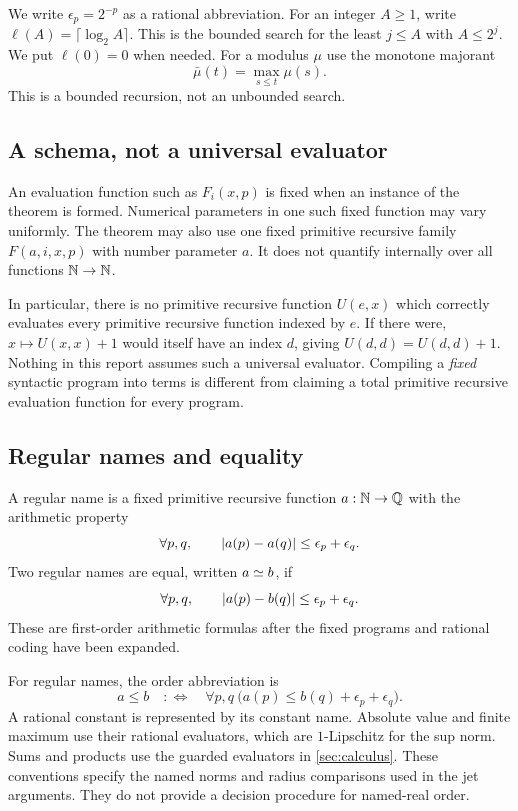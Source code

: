 We write $\epsilon_p=2^{-p}$ as a rational abbreviation. For an integer
$A\ge1$, write $\ell(A)=\lceil\log_2 A\rceil$. This is the bounded search
for the least $j\le A$ with $A\le2^j$. We put $\ell(0)=0$ when needed.
For a modulus $\mu$ use the monotone majorant
\[
 \bar\mu(t)=\max_{s\le t}\mu(s).
\]
This is a bounded recursion, not an unbounded search.

\subsection{A schema, not a universal evaluator}\label{sec:schema}

An evaluation function such as $F_i(x,p)$ is fixed when an instance of the
theorem is formed. Numerical parameters in one such fixed function may vary
uniformly. The theorem may also use one fixed primitive recursive family
$F(a,i,x,p)$ with number parameter $a$. It does not quantify internally over
all functions $\mathbb N\to\mathbb N$.

In particular, there is no primitive recursive function $U(e,x)$ which
correctly evaluates every primitive recursive function indexed by $e$.
If there were, $x\mapsto U(x,x)+1$ would itself have an index $d$, giving
$U(d,d)=U(d,d)+1$. Nothing in this report assumes such a universal evaluator.
Compiling a \emph{fixed} syntactic program into terms is different from
claiming a total primitive recursive evaluation function for every program.

\subsection{Regular names and equality}

\begin{definition}
A regular name is a fixed primitive recursive function $a:\mathbb N\to\mathbb Q$ with
the arithmetic property
\begin{equation}\label{eq:regular}
 \forall p,q,\qquad \left|a(p)-a(q)\right|\le\epsilon_p+\epsilon_q.
\end{equation}
Two regular names are equal, written $a\mathrel{\simeq} b$, if
\begin{equation}\label{eq:name-equality}
 \forall p,q,\qquad \left|a(p)-b(q)\right|\le\epsilon_p+\epsilon_q.
\end{equation}
These are first-order arithmetic formulas after the fixed programs and
rational coding have been expanded.
\end{definition}

For regular names, the order abbreviation is
\[
 a\le b\quad:\Longleftrightarrow\quad
 \forall p,q\ \bigl(a(p)\le b(q)+\epsilon_p+\epsilon_q\bigr).
\]
A rational constant is represented by its constant name. Absolute value
and finite maximum use their rational evaluators, which are
$1$-Lipschitz for the sup norm. Sums and products use the guarded evaluators
in \cref{sec:calculus}. These conventions specify the named norms and
radius comparisons used in the jet arguments. They do not provide a
decision procedure for named-real order.

